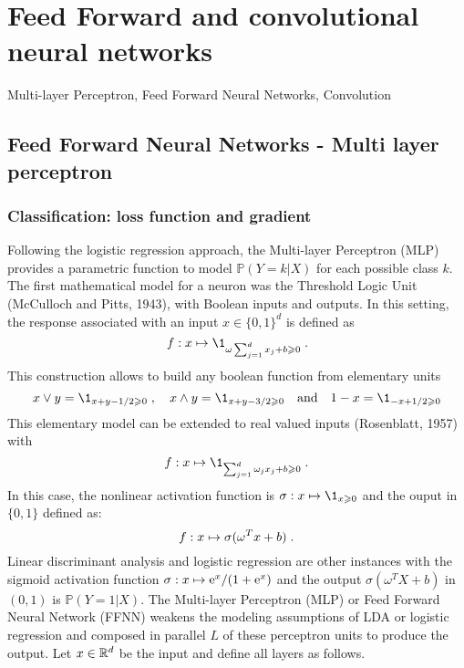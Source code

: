 \chapter{Feed Forward and convolutional neural networks}
\minitoc
\begin{kwd}
Multi-layer Perceptron, Feed Forward Neural Networks, Convolution
\end{kwd}



\section{Feed Forward Neural Networks - Multi layer perceptron} 
\subsection{Classification: loss function and gradient}
Following the logistic regression approach, the Multi-layer Perceptron (MLP) provides a parametric function to model $\mathbb{P}(Y=k | X)$ for each possible class $k$.
The first  mathematical model for a neuron was the Threshold Logic Unit (McCulloch and Pitts, 1943), with Boolean inputs and outputs. In this setting, the response associated with an input $x\in\{0,1\}^d$ is defined as 
$$
f: x\mapsto \1_{\omega\sum_{j=1}^dx_j + b \geqslant 0}\eqsp.
$$ 
This construction allows to build any boolean function from elementary units
\[
x\vee y = \1_{x+y-1/2 \geqslant 0}\eqsp,\quad x\wedge y = \1_{x+y-3/2 \geqslant 0}\quad\mathrm{and}\quad  1-x = \1_{-x+1/2 \geqslant 0}
\] 
This elementary model can be extended to real valued inputs (Rosenblatt, 1957) with 
$$
f: x\mapsto \1_{\sum_{j=1}^d\omega_jx_j + b \geqslant 0}\eqsp.
$$
In this case, the nonlinear activation function is $\sigma: x \mapsto \1_{x\geqslant 0}$ and the ouput in $\{0,1\}$ defined as:
\[
f:x \mapsto \sigma(\omega^Tx + b)\;.
\]
Linear discriminant analysis and logistic regression are other instances with the sigmoid activation function $\sigma: x\mapsto \mathrm{e}^x/(1+\mathrm{e}^x)$ and the output $ \sigma(\omega^TX + b)$ in $(0,1)$ is $\mathbb{P}(Y=1 | X)$.
The Multi-layer Perceptron (MLP) or Feed Forward Neural Network (FFNN) weakens the modeling assumptions of LDA or logistic regression and composed in parallel  $L$ of these perceptron units to produce the output. Let $x\in\mathbb{R}^d$ be the input and define all layers as follows.
